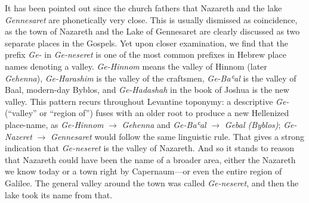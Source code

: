 It has been pointed out since the church fathers that Nazareth and the lake \textit{Gennesaret} are phonetically very close.
This is usually dismissed as coincidence, as the town of Nazareth and the Lake of Gennesaret are clearly discussed as two separate places in the Gospels.
Yet upon closer examination, we find that the prefix \textit{Ge-} in \textit{Ge-neseret} is one of the most common prefixes in Hebrew place names denoting a valley.
\textit{Ge-Hinnom} means the valley of Hinnom (later \textit{Gehenna}),
\textit{Ge-Harashim} is the valley of the craftsmen,
\textit{Ge-Baʿal} is the valley of Baal, modern-day Byblos,
and \textit{Ge-Hadashah} in the book of Joshua is the new valley.
This pattern recurs throughout Levantine toponymy: a descriptive \textit{Ge-} (“valley” or “region of”) fuses with an older root to produce a new Hellenized place-name,
as \textit{Ge-Hinnom} $\rightarrow$ \textit{Gehenna} and \textit{Ge-Baʿal} $\rightarrow$ \textit{Gebal (Byblos)};
\textit{Ge-Nazeret} $\rightarrow$ \textit{Gennesaret} would follow the same linguistic rule.
That gives a strong indication that \textit{Ge-neseret} is the valley of Nazareth.
And so it stands to reason that Nazareth could have been the name of a broader area,
either the Nazareth we know today or a town right by Capernaum---or even the entire region of Galilee.
The general valley around the town was called \textit{Ge-neseret}, and then the lake took its name from that.

